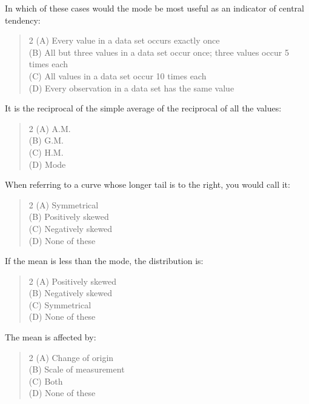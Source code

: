 \documentclass[11pt,a4paper]{article}
\begin{document}
\begin{mcqlist}
\item In which of these cases would the mode be most useful as an indicator of central tendency:
\begin{quote}\begin{multicols}{2}
\noindent (A) Every value in a data set occurs exactly once \\
(B) All but three values in a data set occur once; three values occur 5 times each \\
(C) All values in a data set occur 10 times each \\
(D) Every observation in a data set has the same value
\end{multicols}\end{quote}

\item It is the reciprocal of the simple average of the reciprocal of all the values:
\begin{quote}\begin{multicols}{2}
\noindent (A) A.M. \\
(B) G.M. \\
(C) H.M. \\
(D) Mode
\end{multicols}\end{quote}

\item When referring to a curve whose longer tail is to the right, you would call it:
\begin{quote}\begin{multicols}{2}
\noindent (A) Symmetrical \\
(B) Positively skewed \\
(C) Negatively skewed \\
(D) None of these
\end{multicols}\end{quote}

\item If the mean is less than the mode, the distribution is:
\begin{quote}\begin{multicols}{2}
\noindent (A) Positively skewed \\
(B) Negatively skewed \\
(C) Symmetrical \\
(D) None of these
\end{multicols}\end{quote}

\item The mean is affected by:
\begin{quote}\begin{multicols}{2}
\noindent (A) Change of origin \\
(B) Scale of measurement \\
(C) Both \\
(D) None of these
\end{multicols}\end{quote}


\end{mcqlist}
\end{document}
